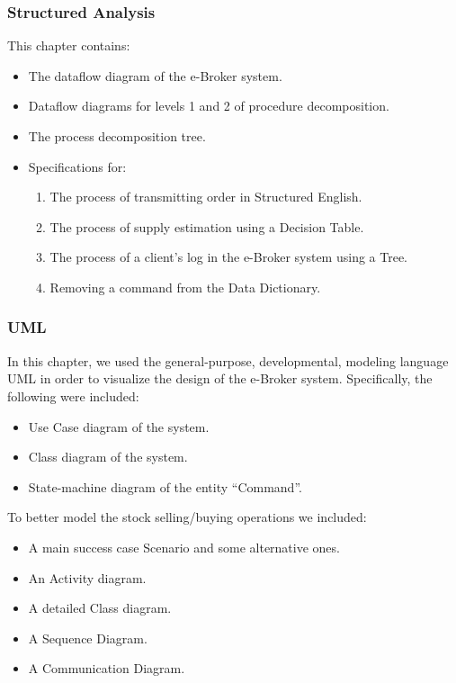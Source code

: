 \documentclass{article}
\begin{document}
\subsubsection{Structured Analysis}
This chapter contains:
\begin{itemize}
\item The dataflow diagram of the e-Broker system.
\item Dataflow diagrams for levels 1 and 2 of procedure decomposition.
\item The process decomposition tree.
\item Specifications for:
\begin{enumerate}
\item The process of transmitting order in Structured English.
\item The process of supply estimation using a Decision Table.
\item The process of a client's log in the e-Broker system using a Tree.
\item Removing a command from the Data Dictionary.  
\end{enumerate}
\end{itemize} 

\subsubsection{UML}
In this chapter, we used the general-purpose, developmental, modeling language UML in order to visualize the design of the e-Broker system. Specifically, the following were included:

\begin{itemize}[{label=\tiny$\triangleright$}]
\item Use Case diagram of the system.
\item Class diagram of the system.
\item State-machine diagram of the entity ``Command''.
\end{itemize}

To better model the stock selling/buying operations we included:

\begin{itemize}[{label=\tiny$\triangleright$}]
\item A main success case Scenario and some alternative ones.
\item An Activity diagram.
\item A detailed Class diagram.
\item A Sequence Diagram.
\item A Communication Diagram.
\end{itemize}
\end{document}
